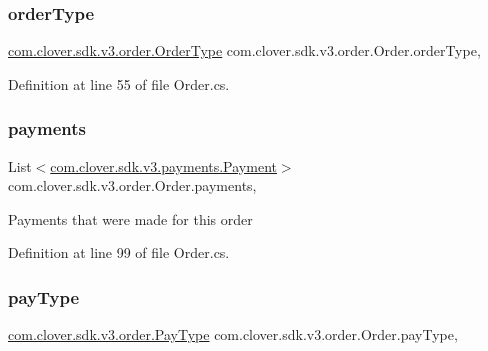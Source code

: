 \subsubsection{\texorpdfstring{order\+Type}{orderType}}
{\footnotesize\ttfamily \hyperlink{classcom_1_1clover_1_1sdk_1_1v3_1_1order_1_1_order_type}{com.\+clover.\+sdk.\+v3.\+order.\+Order\+Type} com.\+clover.\+sdk.\+v3.\+order.\+Order.\+order\+Type\hspace{0.3cm}{\ttfamily [get]}, {\ttfamily [set]}}



Definition at line 55 of file Order.\+cs.

\mbox{\label{classcom_1_1clover_1_1sdk_1_1v3_1_1order_1_1_order_a0ea40bf866682b62f640bfb510c72223}} 
\subsubsection{\texorpdfstring{payments}{payments}}
{\footnotesize\ttfamily List$<$\hyperlink{classcom_1_1clover_1_1sdk_1_1v3_1_1payments_1_1_payment}{com.\+clover.\+sdk.\+v3.\+payments.\+Payment}$>$ com.\+clover.\+sdk.\+v3.\+order.\+Order.\+payments\hspace{0.3cm}{\ttfamily [get]}, {\ttfamily [set]}}



Payments that were made for this order 



Definition at line 99 of file Order.\+cs.

\mbox{\label{classcom_1_1clover_1_1sdk_1_1v3_1_1order_1_1_order_a79bae0bc2259c5b9629a477f1d3aebc1}} 
\subsubsection{\texorpdfstring{pay\+Type}{payType}}
{\footnotesize\ttfamily \hyperlink{namespacecom_1_1clover_1_1sdk_1_1v3_1_1order_a0087c2efbeb2cfefd1bc3b78a3f7dbd8}{com.\+clover.\+sdk.\+v3.\+order.\+Pay\+Type} com.\+clover.\+sdk.\+v3.\+order.\+Order.\+pay\+Type\hspace{0.3cm}{\ttfamily [get]}, {\ttfamily [set]}}



